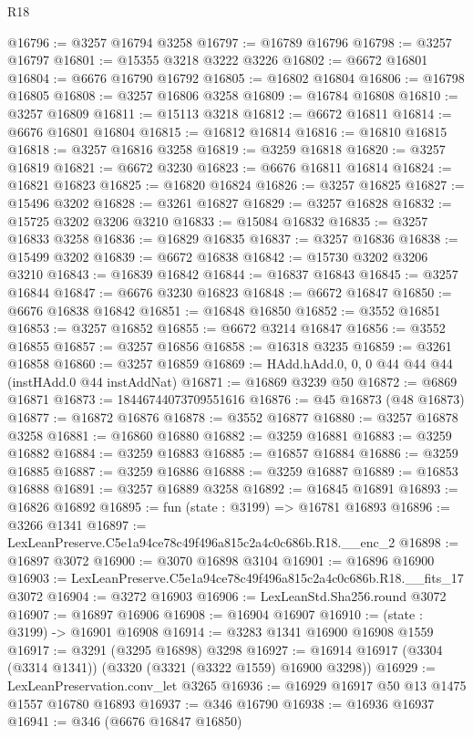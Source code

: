 \begin{lexlean}{R18}
\begin{coremodule}
@16796 := @3257 @16794 @3258
@16797 := @16789 @16796
@16798 := @3257 @16797
@16801 := @15355 @3218 @3222 @3226
@16802 := @6672 @16801
@16804 := @6676 @16790 @16792
@16805 := @16802 @16804
@16806 := @16798 @16805
@16808 := @3257 @16806 @3258
@16809 := @16784 @16808
@16810 := @3257 @16809
@16811 := @15113 @3218
@16812 := @6672 @16811
@16814 := @6676 @16801 @16804
@16815 := @16812 @16814
@16816 := @16810 @16815
@16818 := @3257 @16816 @3258
@16819 := @3259 @16818
@16820 := @3257 @16819
@16821 := @6672 @3230
@16823 := @6676 @16811 @16814
@16824 := @16821 @16823
@16825 := @16820 @16824
@16826 := @3257 @16825
@16827 := @15496 @3202
@16828 := @3261 @16827
@16829 := @3257 @16828
@16832 := @15725 @3202 @3206 @3210
@16833 := @15084 @16832
@16835 := @3257 @16833 @3258
@16836 := @16829 @16835
@16837 := @3257 @16836
@16838 := @15499 @3202
@16839 := @6672 @16838
@16842 := @15730 @3202 @3206 @3210
@16843 := @16839 @16842
@16844 := @16837 @16843
@16845 := @3257 @16844
@16847 := @6676 @3230 @16823
@16848 := @6672 @16847
@16850 := @6676 @16838 @16842
@16851 := @16848 @16850
@16852 := @3552 @16851
@16853 := @3257 @16852
@16855 := @6672 @3214 @16847
@16856 := @3552 @16855
@16857 := @3257 @16856
@16858 := @16318 @3235
@16859 := @3261 @16858
@16860 := @3257 @16859
@16869 := HAdd.hAdd.{0, 0, 0} @44 @44 @44 (instHAdd.{0} @44 instAddNat)
@16871 := @16869 @3239 @50
@16872 := @6869 @16871
@16873 := 18446744073709551616
@16876 := @45 @16873 (@48 @16873)
@16877 := @16872 @16876
@16878 := @3552 @16877
@16880 := @3257 @16878 @3258
@16881 := @16860 @16880
@16882 := @3259 @16881
@16883 := @3259 @16882
@16884 := @3259 @16883
@16885 := @16857 @16884
@16886 := @3259 @16885
@16887 := @3259 @16886
@16888 := @3259 @16887
@16889 := @16853 @16888
@16891 := @3257 @16889 @3258
@16892 := @16845 @16891
@16893 := @16826 @16892
@16895 := fun (state : @3199) => @16781 @16893
@16896 := @3266 @1341
@16897 := LexLeanPreserve.C5e1a94ce78c49f496a815c2a4c0c686b.R18.__enc_2
@16898 := @16897 @3072
@16900 := @3070 @16898 @3104
@16901 := @16896 @16900
@16903 := LexLeanPreserve.C5e1a94ce78c49f496a815c2a4c0c686b.R18.__fits_17 @3072
@16904 := @3272 @16903
@16906 := LexLeanStd.Sha256.round @3072
@16907 := @16897 @16906
@16908 := @16904 @16907
@16910 := (state : @3199) -> @16901 @16908
@16914 := @3283 @1341 @16900 @16908 @1559
@16917 := @3291 (@3295 @16898) @3298
@16927 := @16914 @16917 (@3304 (@3314 @1341)) (@3320 (@3321 (@3322 @1559) @16900 @3298))
@16929 := LexLeanPreservation.conv_let @3265
@16936 := @16929 @16917 @50 @13 @1475 @1557 @16780 @16893
@16937 := @346 @16790
@16938 := @16936 @16937
@16941 := @346 (@6676 @16847 @16850)

\end{coremodule}
\end{lexlean}
